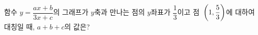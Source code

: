 함수 $y=\dfrac{ax+b}{3x+c}$의 그래프가 $y$축과 만나는 점의 $y$좌표가 $\dfrac{1}{3}$이고 점~$\left(1{,}\mkern3mu\mathopen{}\dfrac{5}{3}\right)$에 대하여 대칭일 때, $a+b+c$의 값은? 
